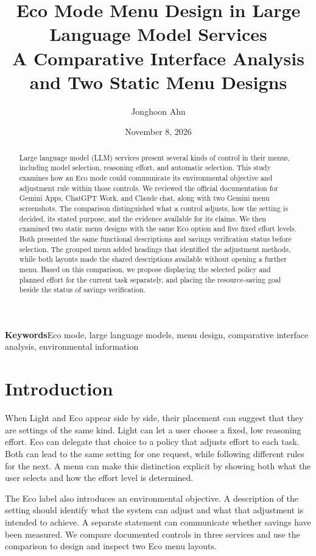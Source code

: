\documentclass[11pt,letterpaper]{article}
\title{Eco Mode Menu Design in Large Language Model Services\\[0.4em]
\large A Comparative Interface Analysis and Two Static Menu Designs}
\author{Jonghoon Ahn}
\date{November 8, 2026}
\begin{document}
\maketitle

\begin{abstract}
Large language model (LLM) services present several kinds of control in
their menus, including model selection, reasoning effort, and automatic
selection. This study examines how an Eco mode could communicate its
environmental objective and adjustment rule within those controls. We
reviewed the official documentation for Gemini Apps, ChatGPT Work, and
Claude chat, along with two Gemini menu screenshots. The comparison
distinguished what a control adjusts, how the setting is decided, its
stated purpose, and the evidence available for its claims. We then
examined two static menu designs with the same Eco option and five fixed
effort levels. Both presented the same functional descriptions and
savings verification status before selection. The grouped menu added
headings that identified the adjustment methods, while both layouts made
the shared descriptions available without opening a further menu. Based
on this comparison, we propose displaying the selected policy and
planned effort for the current task separately, and placing the
resource-saving goal beside the status of savings verification.
\end{abstract}

\textbf{Keywords}\enspace Eco mode, large language models, menu design,
comparative interface analysis, environmental information

\section{Introduction}

When Light and Eco appear side by side, their placement can suggest that
they are settings of the same kind. Light can let a user choose a fixed,
low reasoning effort. Eco can delegate that choice to a policy that
adjusts effort to each task. Both can lead to the same setting for one
request, while following different rules for the next. A menu can make
this distinction explicit by showing both what the user selects and
how the effort level is determined.

The Eco label also introduces an environmental objective. A description
of the setting should identify what the system can adjust and what that
adjustment is intended to achieve. A separate statement can communicate
whether savings have been measured. We compare documented controls in
three services and use the comparison to design and inspect two Eco
menu layouts.
\end{document}
